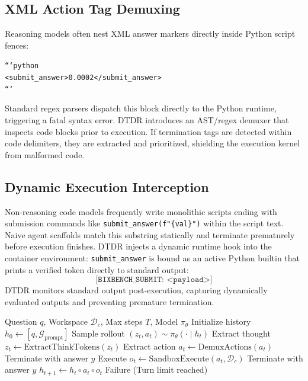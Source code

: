 \documentclass[11pt,letterpaper]{article}
\begin{document}
\subsection{XML Action Tag Demuxing}
Reasoning models often nest XML answer markers directly inside Python script fences:
\begin{center}
\small
\texttt{```python} \\
\texttt{<submit\_answer>0.0002</submit\_answer>} \\
\texttt{```}
\end{center}
Standard regex parsers dispatch this block directly to the Python runtime, triggering a fatal syntax error. DTDR introduces an AST/regex demuxer that inspects code blocks prior to execution. If termination tags are detected within code delimiters, they are extracted and prioritized, shielding the execution kernel from malformed code.

\subsection{Dynamic Execution Interception}
Non-reasoning code models frequently write monolithic scripts ending with submission commands like \texttt{submit\_answer(f"\{val\}")} within the script text. Naive agent scaffolds match this substring statically and terminate prematurely before execution finishes. DTDR injects a dynamic runtime hook into the container environment: \texttt{submit\_answer} is bound as an active Python builtin that prints a verified token directly to standard output:
\begin{equation}
\texttt{[BIXBENCH\_SUBMIT: <payload>]}
\end{equation}
DTDR monitors standard output post-execution, capturing dynamically evaluated outputs and preventing premature termination.

\begin{algorithm}[htbp]
\caption{Dual Track Decoupled Reasoning (DTDR)}
\label{alg:dtdr}
\begin{algorithmic}[1]
\REQUIRE Question $q$, Workspace $\mathcal{D}_c$, Max steps $T$, Model $\pi_\theta$
\STATE Initialize history $h_0 \leftarrow [q, \mathcal{G}_{\text{prompt}}]$
    \STATE Sample rollout $(z_t, a_t) \sim \pi_\theta(\cdot \mid h_t)$
    \STATE Extract thought $z_t \leftarrow \text{ExtractThinkTokens}(z_t)$
    \STATE Extract action $a_t \leftarrow \text{DemuxActions}(a_t)$
        \RETURN Terminate with answer $y$
    \ENDIF
    \STATE Execute $o_t \leftarrow \text{SandboxExecute}(a_t, \mathcal{D}_c)$
        \RETURN Terminate with answer $y$
    \ENDIF
    \STATE $h_{t+1} \leftarrow h_t \circ a_t \circ o_t$ 
\ENDFOR
\RETURN Failure (Turn limit reached)
\end{algorithmic}
\end{algorithm}
\end{document}
